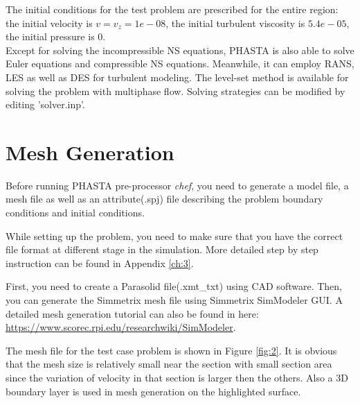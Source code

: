 \documentclass{article}
\begin{document}
The initial conditions for the test problem are prescribed for the entire region: the initial velocity is $v = v_z = 1e-08$, the initial turbulent viscosity is $5.4e-05$, the initial pressure is $0$. \\ 
Except for solving the incompressible NS equations, PHASTA is also able to solve Euler equations and compressible NS equations. Meanwhile, it can employ RANS, LES as well as DES for turbulent modeling. The level-set method is available for solving the problem with multiphase flow. Solving strategies can be modified by editing 'solver.inp'.

\section{Mesh Generation}

Before running PHASTA pre-processor \textit{chef}, you need to generate a model file, a mesh file as well as an attribute(.spj) file describing the problem boundary conditions and initial conditions.

While setting up the problem, you need to make sure that you have the correct file format at different stage in the simulation. More detailed step by step instruction can be found in Appendix \ref{ch:3}.

First, you need to create a Parasolid file(.xmt\_txt) using CAD software. Then, you can generate the Simmetrix mesh file using Simmetrix SimModeler GUI. A detailed mesh generation tutorial can also be found in here:\\
\url{https://www.scorec.rpi.edu/researchwiki/SimModeler}.

The mesh file for the test case problem is shown in Figure \ref{fig:2}. It is obvious that the mesh size is relatively small near the section with small section area since the variation of velocity in that section is larger then the others. Also a 3D boundary layer is used in mesh generation on the highlighted surface. 
\end{document}
